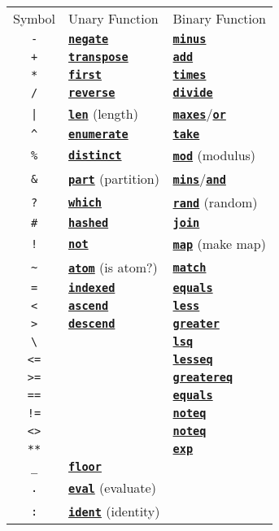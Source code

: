 \documentclass{article}
\newcommand{\primu}[2]{\hyperref[prim:#2]{\textbf{\texttt{#1}}}}
\newcommand{\prim}[1]{\primu{#1}{#1}}
\begin{document}
\pagebreak
\begin{table}[h]
	\centering
	\begin{tabular}{| c | l | l |}
		\hline
		\cellcolor{tableHeaderColor} Symbol &
		\cellcolor{tableHeaderColor} Unary Function &
		\cellcolor{tableHeaderColor} Binary Function \\
		
		\texttt{-}  & \prim{negate}           & \prim{minus}             \\
		\texttt{+}  & \prim{transpose}        & \prim{add}               \\
		\texttt{*}  & \prim{first}            & \prim{times}             \\
		\texttt{/}  & \prim{reverse}          & \prim{divide}            \\
		\texttt{|}  & \prim{len} (length)     & \prim{maxes}/\prim{or}   \\
		\texttt{\^} & \prim{enumerate}        & \prim{take}              \\
		\texttt{\%} & \prim{distinct}         & \prim{mod} (modulus)     \\
		\texttt{\&} & \prim{part} (partition) & \prim{mins}/\prim{and}   \\
		\texttt{?}  & \prim{which}            & \prim{rand} (random)     \\
		\texttt{\#} & \prim{hashed}           & \prim{join}              \\
		\texttt{!}  & \prim{not}              & \prim{map} (make map)    \\
		\texttt{\~} & \prim{atom} (is atom?)  & \prim{match}             \\
		\texttt{=}  & \prim{indexed}          & \prim{equals}            \\
		\texttt{<}  & \prim{ascend}           & \prim{less}              \\
		\texttt{>}  & \prim{descend}          & \prim{greater}           \\
		\texttt{\textbackslash} &             & \prim{lsq}               \\
		\texttt{<=} &                         & \prim{lesseq}            \\
		\texttt{>=} &                         & \prim{greatereq}         \\
		\texttt{==} &                         & \prim{equals}            \\
		\texttt{!=} &                         & \prim{noteq}             \\
		\texttt{<>} &                         & \prim{noteq}             \\
		\texttt{**} &                         & \prim{exp}               \\
		\texttt{\_} & \prim{floor}            &                          \\
		\texttt{.}  & \prim{eval} (evaluate)  &                          \\
		\texttt{:}  & \prim{ident} (identity) &                          \\


\end{tabular}
\end{table}
\end{document}
